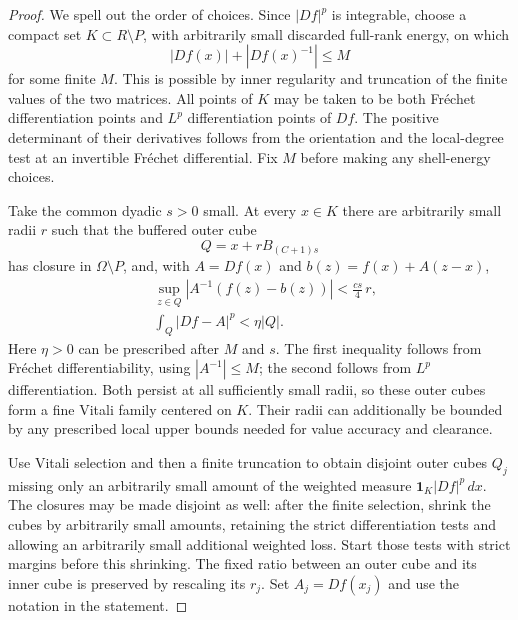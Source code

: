 \begin{proof}
We spell out the order of choices.  Since $|Df|^p$ is integrable,
choose a compact set $K\subset R\setminus P$, with arbitrarily
small discarded full-rank energy, on which
\[
 |Df(x)|+|Df(x)^{-1}|\leq M
\]
for some finite $M$.  This is possible by inner regularity and
truncation of the finite values of the two matrices.  All points of
$K$ may be taken to be both Fr\'echet differentiation points and
$L^p$ differentiation points of $Df$.  The positive determinant of
their derivatives follows from the orientation and the local-degree
test at an invertible Fr\'echet differential.  Fix $M$ before making
any shell-energy choices.

Take the common dyadic $s>0$ small.  At every $x\in K$ there are
arbitrarily small radii $r$ such that the buffered outer cube
\[
 Q=x+rB_{(C+1)s}
\]
has closure in $\Omega\setminus P$, and, with $A=Df(x)$ and
$b(z)=f(x)+A(z-x)$,
\begin{align}
 &\sup_{z\in Q}|A^{-1}(f(z)-b(z))|
       <\frac{cs}{4}\,r,\label{hp:jet-value-test}\\
 &\int_Q|Df-A|^p<\eta|Q|.\label{hp:jet-energy-test}
\end{align}
Here $\eta>0$ can be prescribed after $M$ and $s$.
The first inequality follows from Fr\'echet differentiability,
using $|A^{-1}|\leq M$; the second follows from $L^p$
differentiation.  Both persist at all sufficiently small radii, so
these outer cubes form a fine Vitali family centered on $K$.
Their radii can additionally be bounded by any prescribed local
upper bounds needed for value accuracy and clearance.

Use Vitali selection and then a finite truncation to obtain disjoint
outer cubes $Q_j$ missing only an arbitrarily small amount of the
weighted measure $\mathbf1_K|Df|^p\,dx$.  The closures may be made
disjoint as well: after the finite selection, shrink the cubes by
arbitrarily small amounts, retaining the strict differentiation
tests and allowing an arbitrarily small additional weighted loss.
Start those tests with strict margins before this shrinking.  The
fixed ratio between an outer cube and its inner cube is preserved
by rescaling its $r_j$.  Set $A_j=Df(x_j)$ and use the notation in
the statement.


\end{proof}
